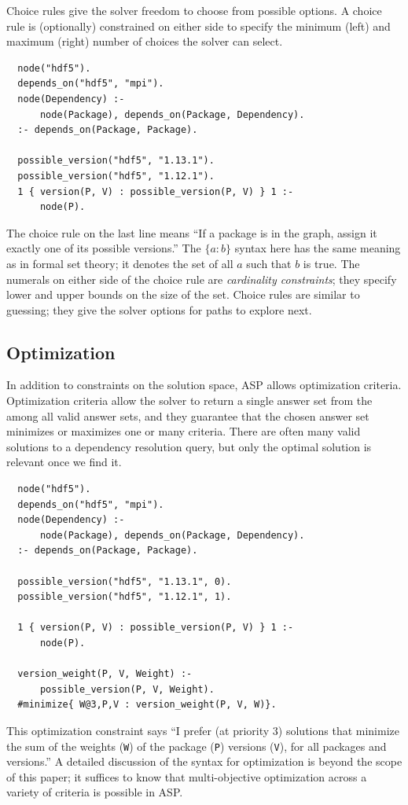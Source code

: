 Choice rules give the solver freedom to choose from possible options. A choice rule is
(optionally) constrained on either side to specify the minimum (left) and maximum
(right) number of choices the solver can select.
\begin{verbatim}
  node("hdf5").
  depends_on("hdf5", "mpi").
  node(Dependency) :-
      node(Package), depends_on(Package, Dependency).
  :- depends_on(Package, Package).

  possible_version("hdf5", "1.13.1").
  possible_version("hdf5", "1.12.1").
  1 { version(P, V) : possible_version(P, V) } 1 :-
      node(P).
\end{verbatim}
The choice rule on the last line means ``If a package is in the graph, assign it
exactly one of its possible versions.'' The $\{a:b\}$ syntax here has the same meaning
as in formal set theory; it denotes the set of all $a$ such that $b$ is true. The
numerals on either side of the choice rule are {\it cardinality constraints}; they specify
lower and upper bounds on the size of the set. Choice rules are similar to guessing;
they give the solver options for paths to explore next.


\subsection{Optimization}

In addition to constraints on the solution space, ASP allows optimization criteria.
Optimization criteria allow the solver to return a single answer set from the among all
valid answer sets, and they guarantee that the chosen answer set minimizes or maximizes one
or many criteria. There are often many valid solutions to a dependency resolution query,
but only the optimal solution is relevant once we find it.
\begin{verbatim}
  node("hdf5").
  depends_on("hdf5", "mpi").
  node(Dependency) :-
      node(Package), depends_on(Package, Dependency).
  :- depends_on(Package, Package).

  possible_version("hdf5", "1.13.1", 0).
  possible_version("hdf5", "1.12.1", 1).

  1 { version(P, V) : possible_version(P, V) } 1 :-
      node(P).

  version_weight(P, V, Weight) :-
      possible_version(P, V, Weight).
  #minimize{ W@3,P,V : version_weight(P, V, W)}.
\end{verbatim}
This optimization constraint says ``I prefer (at priority 3) solutions that minimize the
sum of the weights ({\tt W}) of the package ({\tt P}) versions ({\tt V}), for all
packages and versions.'' A detailed discussion of the syntax for optimization is beyond
the scope of this paper; it suffices to know that multi-objective optimization across a
variety of criteria is possible in ASP.

